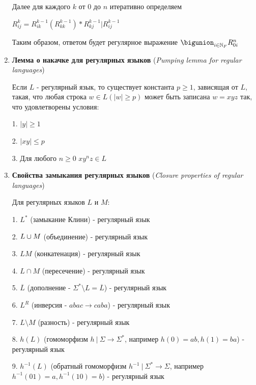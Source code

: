\documentclass[12pt]{article}
\begin{document}
\begin{enumerate}
        Далее для каждого $k$ от $0$ до $n$ итеративно определяем

        $R^k_{ij} = R^{k - 1}_{ik} (R^{k - 1}_{kk})* R^{k-1}_{kj} | R^{k-1}_{ij}$

        Таким образом, ответом будет регулярное выражение $\bigunion_{i \in \Natural_F} R^n_{0i}$

        \item \textbf{Лемма о накачке для регулярных языков} (\textit{Pumping lemma for regular languages})

        Если $L$ - регулярный язык, то существует константа $p \geq 1$, зависящая от $L$, такая, что любая строка $w \in L (|w| \geq p)$
        может быть записана $w = xyz$ так, что удовлетворены условия:

        1. $|y| \geq 1$

        2. $|xy| \leq p$

        3. Для любого $n \geq 0$ $xy^n z \in L$

        \item \textbf{Свойства замыкания регулярных языков} (\textit{Closure properties of regular languages})

        Для регулярных языков $L$ и $M$:

        1. $L^*$ (замыкание Клини) - регулярный язык

        2. $L \cup M$ (объединение) - регулярный язык

        3. $LM$ (конкатенация) - регулярный язык

        4. $L \cap M$ (пересечение) - регулярный язык

        5. $\overline{L}$ (дополнение - $\Sigma^* \setminus L = \overline{L}$) - регулярный язык

        6. $L^R$ (инверсия - $abac \to caba$) - регулярный язык

        7. $L \setminus M$ (разность) - регулярный язык

        8. $h(L)$ (гомоморфизм $h \ | \ \Sigma \to \Sigma^*$, например $h(0) = ab, h(1) = ba$) - регулярный язык

        9. $h^{-1}(L)$ (обратный гомоморфизм $h^{-1} \ | \ \Sigma^* \to \Sigma$, например $h^{-1}(01) = a, h^{-1}(10) = b$) - регулярный язык

        \smallvspace

        \begin{minipage}{\linewidth}
            \begin{figure}


\end{figure}
\end{minipage}
\end{enumerate}
\end{document}
